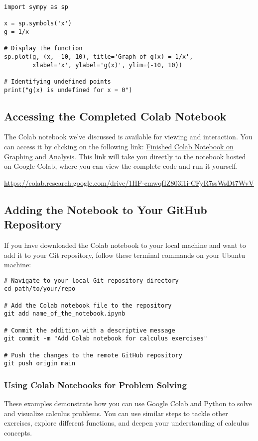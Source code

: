 \documentclass[a4paper,12pt]{book}
\newcounter{problem}
\newcounter{example}
\begin{document}
\begin{verbatim}
import sympy as sp

x = sp.symbols('x')
g = 1/x

# Display the function
sp.plot(g, (x, -10, 10), title='Graph of g(x) = 1/x',
        xlabel='x', ylabel='g(x)', ylim=(-10, 10))

# Identifying undefined points
print("g(x) is undefined for x = 0")
\end{verbatim}

\subsection*{Accessing the Completed Colab Notebook}

The Colab notebook we've discussed is available for viewing and interaction. You can access it by clicking on the following link: \href{https://colab.research.google.com/drive/1HF-cmwqfIZ803i1i-CFyR7ssWsDt7WvV}{Finished Colab Notebook on Graphing and Analysis}. This link will take you directly to the notebook hosted on Google Colab, where you can view the complete code and run it yourself.

\url{https://colab.research.google.com/drive/1HF-cmwqfIZ803i1i-CFyR7ssWsDt7WvV}

\subsection*{Adding the Notebook to Your GitHub Repository}

If you have downloaded the Colab notebook to your local machine and want to add it to your Git repository, follow these terminal commands on your Ubuntu machine:

\begin{verbatim}
# Navigate to your local Git repository directory
cd path/to/your/repo

# Add the Colab notebook file to the repository
git add name_of_the_notebook.ipynb

# Commit the addition with a descriptive message
git commit -m "Add Colab notebook for calculus exercises"

# Push the changes to the remote GitHub repository
git push origin main
\end{verbatim}


\subsubsection*{Using Colab Notebooks for Problem Solving}
These examples demonstrate how you can use Google Colab and Python to solve and visualize calculus problems. You can use similar steps to tackle other exercises, explore different functions, and deepen your understanding of calculus concepts.
\end{document}
